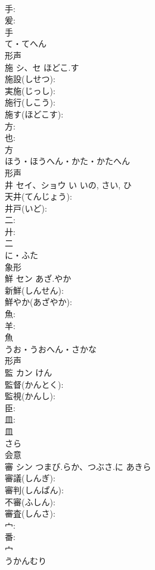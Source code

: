 \documentclass[8pt]{extreport}
\begin{document}
\begin{CJK}{UTF8}{min}
\\	手: 
\\	爰: 
\\	手	
\\	て・てへん	
\\	形声 
\\	施	シ、セ	ほどこ.す		
\\	施設(しせつ): 
\\	実施(じっし): 
\\	施行(しこう): 
\\	施す(ほどこす): 
\\	方: 
\\	也: 
\\	方	
\\	ほう・ほうへん・かた・かたへん	
\\	形声 
\\	井	セイ、ショウ	い	いの, さい, ひ	
\\	天井(てんじょう): 
\\	井戸(いど): 
\\	二: 
\\	廾: 
\\	二	
\\	に・ふた	
\\	象形 
\\	鮮	セン	あざ.やか		
\\	新鮮(しんせん): 
\\	鮮やか(あざやか): 
\\	魚: 
\\	羊: 
\\	魚	
\\	うお・うおへん・さかな	
\\	形声 
\\	監	カン		けん	
\\	監督(かんとく): 
\\	監視(かんし): 
\\	臣: 
\\	皿: 
\\	皿	
\\	さら	
\\	会意 
\\	審	シン	つまび.らか、つぶさ.に	あきら	
\\	審議(しんぎ): 
\\	審判(しんぱん): 
\\	不審(ふしん): 
\\	審査(しんさ): 
\\	宀: 
\\	番: 
\\	宀	
\\	うかんむり	

\end{CJK}
\end{document}

